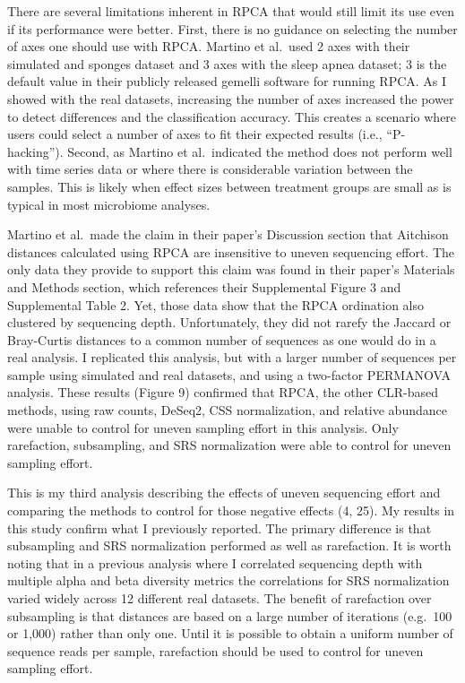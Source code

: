 \documentclass[
  11pt,
]{article}
\begin{document}
There are several limitations inherent in RPCA that would still limit
its use even if its performance were better. First, there is no guidance
on selecting the number of axes one should use with RPCA. Martino et
al.~used 2 axes with their simulated and sponges dataset and 3 axes with
the sleep apnea dataset; 3 is the default value in their publicly
released gemelli software for running RPCA. As I showed with the real
datasets, increasing the number of axes increased the power to detect
differences and the classification accuracy. This creates a scenario
where users could select a number of axes to fit their expected results
(i.e., ``P-hacking''). Second, as Martino et al.~indicated the method
does not perform well with time series data or where there is
considerable variation between the samples. This is likely when effect
sizes between treatment groups are small as is typical in most
microbiome analyses.

Martino et al.~made the claim in their paper's Discussion section that
Aitchison distances calculated using RPCA are insensitive to uneven
sequencing effort. The only data they provide to support this claim was
found in their paper's Materials and Methods section, which references
their Supplemental Figure 3 and Supplemental Table 2. Yet, those data
show that the RPCA ordination also clustered by sequencing depth.
Unfortunately, they did not rarefy the Jaccard or Bray-Curtis distances
to a common number of sequences as one would do in a real analysis. I
replicated this analysis, but with a larger number of sequences per
sample using simulated and real datasets, and using a two-factor
PERMANOVA analysis. These results (Figure 9) confirmed that RPCA, the
other CLR-based methods, using raw counts, DeSeq2, CSS normalization,
and relative abundance were unable to control for uneven sampling effort
in this analysis. Only rarefaction, subsampling, and SRS normalization
were able to control for uneven sampling effort.

This is my third analysis describing the effects of uneven sequencing
effort and comparing the methods to control for those negative effects
(4, 25). My results in this study confirm what I previously reported.
The primary difference is that subsampling and SRS normalization
performed as well as rarefaction. It is worth noting that in a previous
analysis where I correlated sequencing depth with multiple alpha and
beta diversity metrics the correlations for SRS normalization varied
widely across 12 different real datasets. The benefit of rarefaction
over subsampling is that distances are based on a large number of
iterations (e.g.~100 or 1,000) rather than only one. Until it is
possible to obtain a uniform number of sequence reads per sample,
rarefaction should be used to control for uneven sampling effort.
\end{document}
